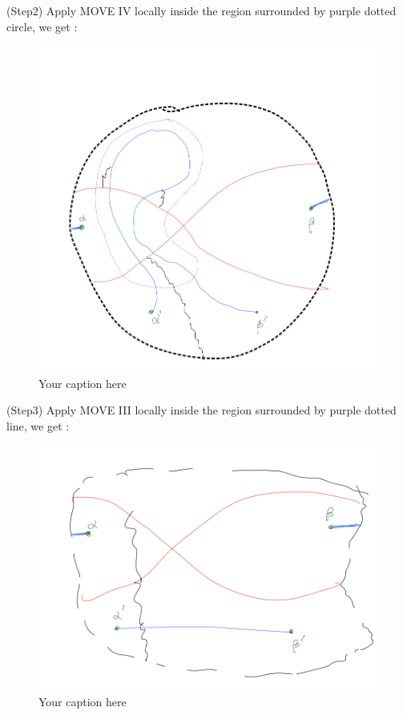 (Step2) Apply MOVE \RN{4} locally inside the region surrounded by purple dotted circle, we get :

\begin{figure}[H] %
    \centering
    \includegraphics[width=\linewidth]{diagrams/definition9/3.png} %
    \caption{Your caption here}
    \label{fig:your-label}
\end{figure}

(Step3) Apply MOVE \RN{3} locally inside the region surrounded by purple dotted line, we get :
\begin{figure}[H] %
    \centering
    \includegraphics[width=\linewidth]{diagrams/definition9/4.png} %
    \caption{Your caption here}
    \label{fig:your-label}
\end{figure}